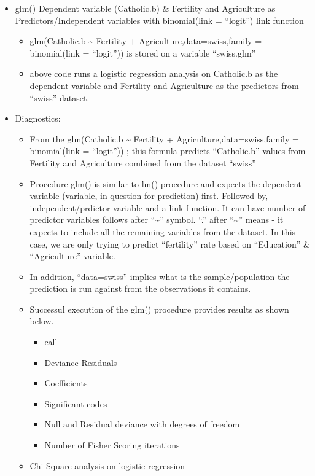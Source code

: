 \documentclass[]{article}
\providecommand{\tightlist}{%
  \setlength{\itemsep}{0pt}\setlength{\parskip}{0pt}}
\begin{document}
\begin{itemize}
\tightlist
\item
  glm() \textbar{} Dependent variable (Catholic.b) \& Fertility and
  Agriculture as Predictors/Independent variables with binomial(link =
  ``logit'') link function

  \begin{itemize}
  \tightlist
  \item
    glm(Catholic.b \textasciitilde{} Fertility +
    Agriculture,data=swiss,family = binomial(link = ``logit'')) is
    stored on a variable ``swiss.glm''
  \item
    above code runs a logistic regression analysis on Catholic.b as the
    dependent variable and Fertility and Agriculture as the predictors
    from ``swiss'' dataset.
  \end{itemize}
\item
  Diagnostics:

  \begin{itemize}
  \tightlist
  \item
    From the glm(Catholic.b \textasciitilde{} Fertility +
    Agriculture,data=swiss,family = binomial(link = ``logit'')) ; this
    formula predicts ``Catholic.b'' values from Fertility and
    Agriculture combined from the dataset ``swiss''
  \item
    Procedure glm() is similar to lm() procedure and expects the
    dependent variable (variable, in question for prediction) first.
    Followed by, independent/prdictor variable and a link function. It
    can have number of predictor variables follows after
    ``\textasciitilde{}'' symbol. ``.'' after ``\textasciitilde{}''
    means - it expects to include all the remaining variables from the
    dataset. In this case, we are only trying to predict ``fertility''
    rate based on ``Education'' \& ``Agriculture'' variable.
  \item
    In addition, ``data=swiss'' implies what is the sample/population
    the prediction is run against from the observations it contains.
  \item
    Successul execution of the glm() procedure provides results as shown
    below.

    \begin{itemize}
    \tightlist
    \item
      call
    \item
      Deviance Residuals
    \item
      Coefficients
    \item
      Significant codes
    \item
      Null and Residual deviance with degrees of freedom
    \item
      Number of Fisher Scoring iterations
    \end{itemize}
  \item
    Chi-Square analysis on logistic regression


\end{itemize}
\end{itemize}
\end{document}
